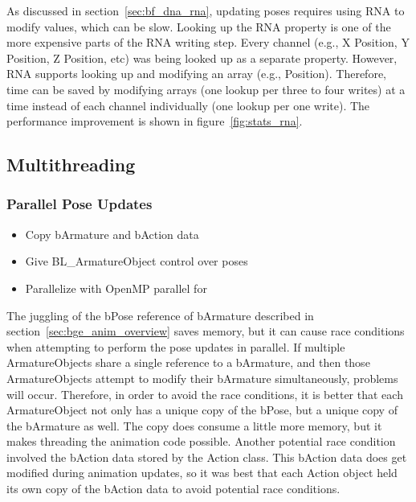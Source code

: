 As discussed in section~\ref{sec:bf_dna_rna}, updating poses requires using RNA to modify values, which can be slow.
Looking up the RNA property is one of the more expensive parts of the RNA writing step.
Every channel (e.g., X Position, Y Position, Z Position, etc) was being looked up as a separate property.
However, RNA supports looking up and modifying an array (e.g., Position).
Therefore, time can be saved by modifying arrays (one lookup per three to four writes) at a time instead of each channel individually (one lookup per one write).
The performance improvement is shown in figure~\ref{fig:stats_rna}.


\subsection{Multithreading}
\subsubsection{Parallel Pose Updates}
\ifsummaries
\begin{itemize}
 \item Copy bArmature and bAction data
 \item Give BL\_ArmatureObject control over poses
 \item Parallelize with OpenMP parallel for
\end{itemize}
\fi

The juggling of the bPose reference of bArmature described in section~\ref{sec:bge_anim_overview} saves memory, but it can cause race conditions when attempting to perform the pose updates in parallel.
If multiple ArmatureObjects share a single reference to a bArmature, and then those ArmatureObjects attempt to modify their bArmature simultaneously, problems will occur.
Therefore, in order to avoid the race conditions, it is better that each ArmatureObject not only has a unique copy of the bPose, but a unique copy of the bArmature as well.
The copy does consume a little more memory, but it makes threading the animation code possible.
Another potential race condition involved the bAction data stored by the Action class.
This bAction data does get modified during animation updates, so it was best that each Action object held its own copy of the bAction data to avoid potential race conditions.


